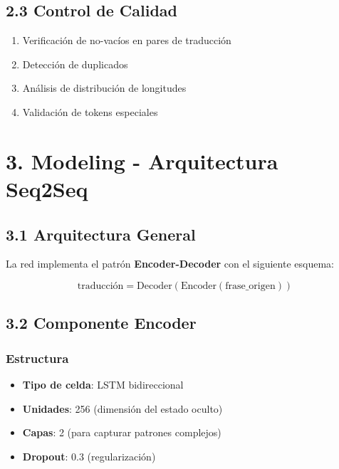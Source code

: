 \documentclass[12pt,a4paper]{article}
\begin{document}
\subsection{2.3 Control de Calidad}
\begin{enumerate}
    \item Verificación de no-vacíos en pares de traducción
    \item Detección de duplicados
    \item Análisis de distribución de longitudes
    \item Validación de tokens especiales
\end{enumerate}

\section{3. Modeling - Arquitectura Seq2Seq}

\subsection{3.1 Arquitectura General}

La red implementa el patrón \textbf{Encoder-Decoder} con el siguiente esquema:

\begin{equation}
\text{traducción} = \text{Decoder}(\text{Encoder}(\text{frase\_origen}))
\end{equation}

\subsection{3.2 Componente Encoder}

\subsubsection{Estructura}
\begin{itemize}
    \item \textbf{Tipo de celda}: LSTM bidireccional
    \item \textbf{Unidades}: 256 (dimensión del estado oculto)
    \item \textbf{Capas}: 2 (para capturar patrones complejos)
    \item \textbf{Dropout}: 0.3 (regularización)
\end{itemize}
\end{document}
